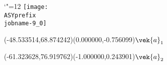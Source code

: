 \setlength{\unitlength}{1pt}%
\makeatletter%
\let\ASYencoding\f@encoding%
\let\ASYfamily\f@family%
\let\ASYseries\f@series%
\let\ASYshape\f@shape%
\makeatother%
{\catcode`"=12%
\texttt{[image: \\ASYprefix\\jobname-9\_0]}%
}%
%
%
\fontsize{8.000000}{9.600000}\selectfont%
\usefont{\ASYencoding}{\ASYfamily}{\ASYseries}{\ASYshape}%
\ASYalign(-48.533514,68.874242)(0.000000,-0.756099){$\vek{a}_1$}%
%
%
\fontsize{8.000000}{9.600000}\selectfont%
\ASYalign(-61.323628,76.919762)(-1.000000,0.243901){$\vek{a}_2$}%
